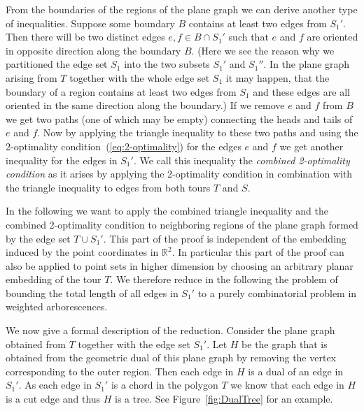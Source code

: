 \documentclass[a4paper, 11pt]{article}
\begin{document}
From the boundaries of the regions of the plane graph we can derive
another type of inequalities. Suppose some boundary $B$ contains at least two edges from $S_1'$. Then there will be two distinct
edges $e,f\in B\cap S_1'$ such that $e$ and $f$ are oriented in opposite direction along the boundary $B$. 
(Here we see the reason why we partitioned the edge set $S_1$ into the two subsets $S_1'$ and $S_1''$. 
In the plane graph arising from $T$ together with the whole edge set $S_1$ it may happen, that the boundary of a region contains 
at least two edges from $S_1$ and these edges are all oriented in the same direction along the boundary.)
If we remove $e$ and $f$ from
$B$ we get two paths (one of which may be empty) connecting the heads and tails of $e$ and $f$. Now by applying 
the triangle inequality to these two paths and using the 2-optimality condition~(\ref{eq:2-optimality}) for the edges $e$ and $f$ 
we get another inequality for the edges in $S_1'$. We call this inequality the \emph{combined 2-optimality condition} as
it arises by applying the 2-optimality condition in combination with the triangle inequality to edges from both tours $T$ and $S$.
   
In the following we want to apply the combined triangle inequality and the combined 2-optimality condition to neighboring regions 
of the plane
graph formed by the edge set $T\cup S_1'$. This part of the proof is independent of the embedding induced by the 
point coordinates in $\mathbb{R}^2$. In particular this part of the proof can also be applied to point sets in higher 
dimension by choosing an arbitrary planar embedding of the tour $T$. We therefore reduce in the following the problem of bounding 
the total length of all edges in $S_1'$ to a purely combinatorial problem in weighted arborescences. \bigskip


We now give a formal description of the reduction. Consider the plane graph obtained from $T$ together with the edge set $S_1'$. 
Let $H$ be the graph that is obtained from
the geometric dual of this plane graph by removing the vertex corresponding to the outer region. Then each edge in $H$ is a dual 
of an edge in 
$S_1'$. As each edge in $S_1'$ is a chord in the polygon $T$ we know that each edge in $H$ is a cut edge and thus $H$ is a tree. 
See Figure~\ref{fig:DualTree} for an example. 
\end{document}
